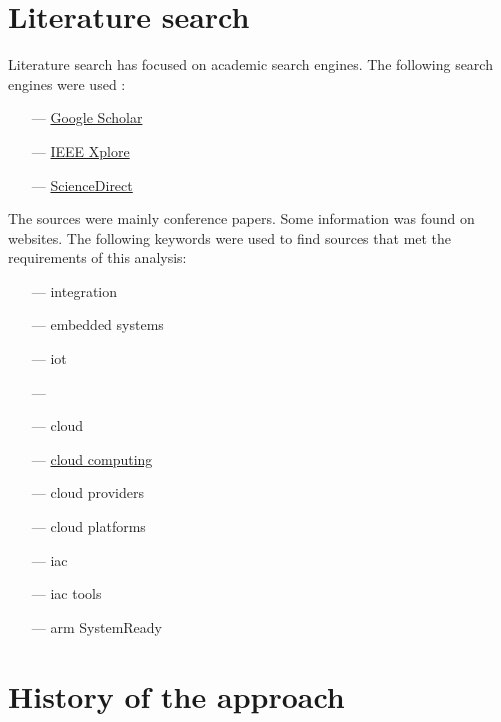 \section{Literature search}

Literature search has focused on academic search engines. The following search engines were used :
\begin{itemize}
    \item[—] \href{https://scholar.google.com}{Google Scholar}
    \item[—] \href{https://ieeexplore.ieee.org/Xplore/home.jsp}{IEEE Xplore}
    \item[—] \href{https://www.sciencedirect.com}{ScienceDirect}
\end{itemize}
The sources were mainly conference papers. Some information was found on websites. The following keywords were used to find sources that met the requirements of this analysis:
\begin{itemize}
    \item[—] integration
    \item[—] embedded systems
    \item[—] \acrshort{iot}
    \item[—] 
    \item[—] \gls{cloud}
    \item[—] \hyperref[subsec:cloudcomputing]{cloud computing}
    \item[—] \gls{cloud} providers
    \item[—] \gls{cloud} platforms
    \item[—] \acrlong{iac}
    \item[—] \acrshort{iac} tools
    \item[—] \gls{arm} SystemReady
\end{itemize}


\section{History of the \texorpdfstring{}{} approach}

